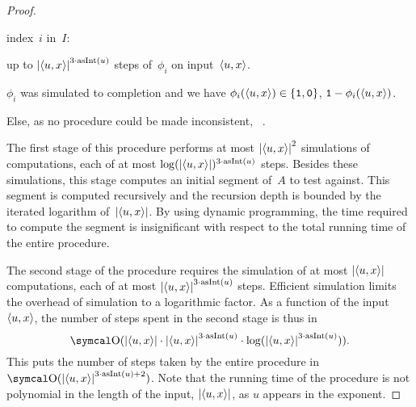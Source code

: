 \begin{proof}
\begin{codelisting}
\begin{codelisting}
    \item
       index~$i$ in~$I$:
      \begin{codelisting}
      \item
         up to $\length{\pair{u}{x}}^{3 \cdot \asNat(u)}$ steps of~$\phi_i$ on input~$\pair{u}{x}$.
      \item
         $\phi_i$ was simulated to completion and we have $\phi_i(\pair{u}{x}) \in \{\bits{1}, \bits{0}\}$,
        \itemcont {} $\bits{1} - \phi_i(\pair{u}{x})$.
      \end{codelisting}
    \item
      Else, as no procedure could be made inconsistent, ~.
    \end{codelisting}
  \end{codelisting}

  The first stage of this procedure performs at most ${\lvert{\langle u, x\rangle}\rvert}^2$ simulations of computations, each of at most $\log({\lvert{\langle u, x\rangle}\rvert})^{3 \cdot \operatorname{asInt}(u)}$ steps.
  Besides these simulations, this stage computes an initial segment of~$A$ to test against.
  This segment is computed recursively and the recursion depth is bounded by the iterated logarithm of~${\lvert{\langle u, x\rangle}\rvert}$.
  By using dynamic programming, the time required to compute the segment is insignificant with respect to the total running time of the entire procedure.

  The second stage of the procedure requires the simulation of at most ${\lvert{\langle u, x\rangle}\rvert}$ computations, each of at most ${\lvert{\langle u, x\rangle}\rvert}^{3 \cdot \operatorname{asInt}(u)}$ steps.
  Efficient simulation \parencite{arora2009computational} limits the overhead of simulation to a logarithmic factor.
  As a function of the input~${\langle u, x\rangle}$, the number of steps spent in the second stage is thus in
  \begin{equation*}
    \bigO(\length{\pair{u}{x}} \cdot \length{\pair{u}{x}}^{3 \cdot \asNat(u)} \cdot \log(\length{\pair{u}{x}}^{3 \cdot \asNat(u)})).
  \end{equation*}
  This puts the number of steps taken by the entire procedure in $\bigO(\length{\pair{u}{x}}^{3 \cdot \asNat(u) + 2})$.
  Note that the running time of the procedure is not polynomial in the length of the input, ${\lvert{\langle u, x\rangle}\rvert}$, as $u$ appears in the exponent.


\end{proof}

